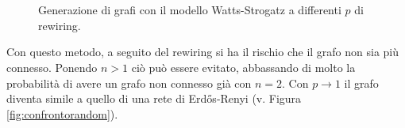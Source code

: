 \begin{figure}[hb!]
	\centering
	$\;\;$
	\\
	$\;\;$
	\caption[Generazione con modello Watts-Strogatz.]{Generazione di grafi con il modello Watts-Strogatz a differenti $p$ di rewiring.}
	\label{fig:watts}
\end{figure}
\clearpage
Con questo metodo, a seguito del rewiring si ha il rischio che il grafo non sia più connesso. Ponendo $n>1$ ciò può essere evitato, abbassando di molto la probabilità di avere un grafo non connesso già con $n=2$. Con $p \rightarrow 1$ il grafo diventa simile a quello di una rete di Erdős-Renyi (v. Figura \ref{fig:confrontorandom}).

